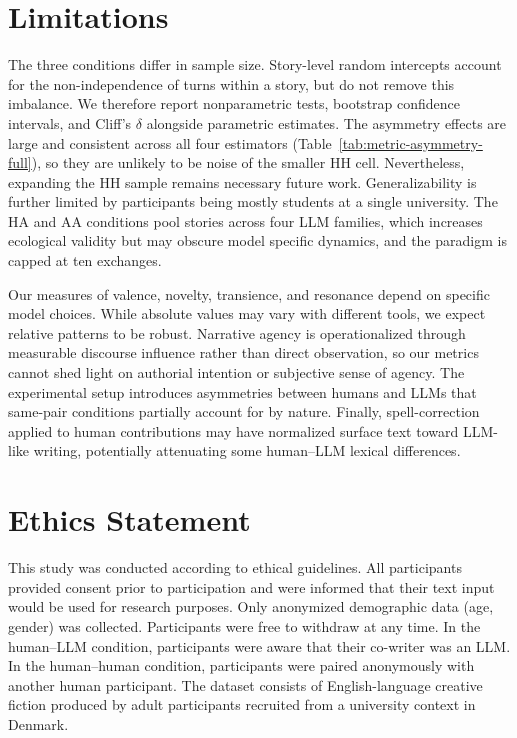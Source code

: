 \documentclass[11pt]{article}
\begin{document}
\section*{Limitations}

The three conditions differ in sample size. Story-level random intercepts account for the non-independence
of turns within a story, but do not remove this imbalance. We
therefore report nonparametric tests, bootstrap confidence intervals, and Cliff's $\delta$ alongside parametric estimates. The asymmetry effects are large and consistent across all four estimators (Table~\ref{tab:metric-asymmetry-full}), so they are unlikely to be noise of the smaller HH cell. Nevertheless, expanding the HH sample remains necessary future work. Generalizability is further limited by participants being mostly students at a single university. The HA
and AA conditions pool stories across four LLM families, which increases ecological validity but may obscure model specific dynamics, and the paradigm is capped at ten exchanges.

Our measures of valence, novelty, transience, and resonance depend on specific model choices. While absolute values may vary with different tools, we expect relative patterns to be robust. Narrative agency is operationalized through measurable discourse influence rather than direct observation, so our metrics cannot shed light on authorial intention or subjective sense of agency. The experimental setup introduces asymmetries between humans and LLMs that same-pair conditions partially account for by nature. Finally, spell-correction applied to human contributions may have normalized surface text toward LLM-like writing, potentially attenuating some human--LLM lexical differences.

\section*{Ethics Statement}
This study was conducted according to ethical guidelines. All participants provided consent prior to participation and were informed that their text input would be used for research purposes. Only anonymized demographic data (age, gender) was collected. Participants were free to withdraw at any time. In the human--LLM condition, participants were aware that their co-writer was an LLM. In the human--human condition, participants were paired anonymously with another human participant. The dataset consists of English-language creative fiction produced by adult participants recruited from a university context in Denmark.
\end{document}

